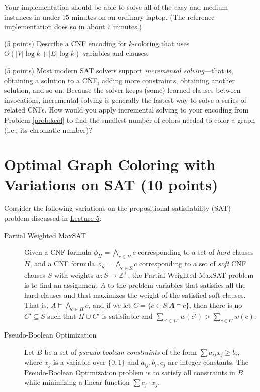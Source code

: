 \documentclass{handout}
\begin{document}
\begin{questions}
Your implementation should be able to solve all of the easy and medium instances in under 15 minutes on an ordinary laptop. 
(The reference implementation does so in about 7 minutes.)



\item (5 points) Describe a CNF encoding for $k$-coloring that uses $O(|V|\log k+|E|\log k)$ variables and clauses.



\item (5 points) Most modern SAT solvers support \emph{incremental solving}---that is, obtaining a solution to a CNF, adding more constraints, obtaining another solution, and so on.  Because the solver keeps (some) learned clauses between invocations, incremental solving is  generally the fastest way to solve a series of related CNFs.  How would you apply incremental solving to your encoding from Problem \ref{prob:kcol} to find the smallest number of colors needed to color a graph (i.e., its chromatic number)?  \label{prob:last}


\end{questions}

\pagebreak

\section{Optimal Graph Coloring with Variations on SAT (10 points)}\label{varsat}

\newcommand\pwm{pwMaxSAT}
\newcommand\tocnf{\operatorname{toCNF}}

Consider the following variations on the propositional satisfiability (SAT) problem discussed in \href{\website/doc/L05.pdf}{Lecture 5}:

\begin{description}

\item[Partial Weighted MaxSAT] Given a CNF formula $\phi_H = \bigwedge_{c \in H} c$ corresponding to a set of \emph{hard} clauses $H$, and a CNF formula $\phi_S = \bigwedge_{c \in S} c$ corresponding to a set of \emph{soft} CNF clauses $S$ with weights $w : S \rightarrow \mathbb{Z^+}$, the Partial Weighted MaxSAT problem is to find an assignment $A$ to the problem variables that satisfies all the hard clauses and that maximizes the weight of the satisfied soft clauses. That is, $A \models \bigwedge_{c \in H} c$, and if we let $C = \{ c\in S | A\models c\}$, then there is no $C'\subseteq S$ such that $H\cup C'$ is satisfiable and $\sum_{c'\in C'} w(c') > \sum_{c\in C} w(c)$.

\item[Pseudo-Boolean Optimization]  Let $B$ be a set of \emph{pseudo-boolean constraints} of the form $\sum a_{ij}x_j \geq b_i$, where $x_j$ is a variable over $\{0, 1\}$ and $a_{ij}, b_i, c_j$ are integer constants.  The Pseudo-Boolean Optimization problem is to satisfy all constraints in $B$ while minimizing a linear function $\sum c_j \cdot x_j$.
\end{description}
%
\end{document}
